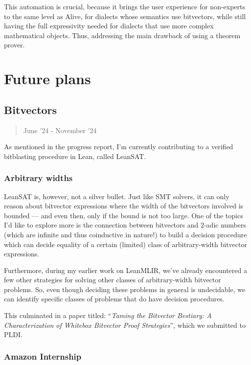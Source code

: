 \documentclass[a4paper]{scrartcl}
\begin{document}
This automation is crucial, 
because it brings the user experience for non-experts to the same level as Alive, 
for dialects whose semantics use bitvectors, 
while still having the full expressivity needed for dialects that use more complex mathematical
objects. Thus, addressing the main drawback of using a theorem prover.


\section{Future plans}\label{future-plans}


\subsection{Bitvectors}\label{bitvectors-1}

\begin{quote}
June '24 - November '24
\end{quote}

As mentioned in the progress report, I'm currently contributing to a
verified bitblasting procedure in Lean, called LeanSAT.


\subsubsection{Arbitrary widths}\label{arbitrary-widths}

LeanSAT is, however, not a silver bullet. Just like SMT solvers, it can
only reason about bitvector expressions where the width of the
bitvectors involved is bounded --- and even then, only if the bound is not too large.
One of the topics I'd like to explore more is the connection between bitvectors and 2-adic numbers (which are
infinite and thus coinductive in nature!) to build a decision procedure
which can decide equality of a certain (limited) class of
arbitrary-width bitvector expressions.

Furthermore, during my earlier work on LeanMLIR, we've already encountered a 
few other strategies for solving other classes of arbitrary-width bitvector problems.
So, even though deciding these problems in general is undecidable, we can identify
specific classes of problems that do have decision procedures.

This culminated in a paper titled: ``\emph{Taming the Bitvector Bestiary: A Characterization of Whitebox Bitvector Proof Strategies}'', 
which we submitted to PLDI.

\subsubsection{Amazon Internship}\label{amazon-internship}
\end{document}
